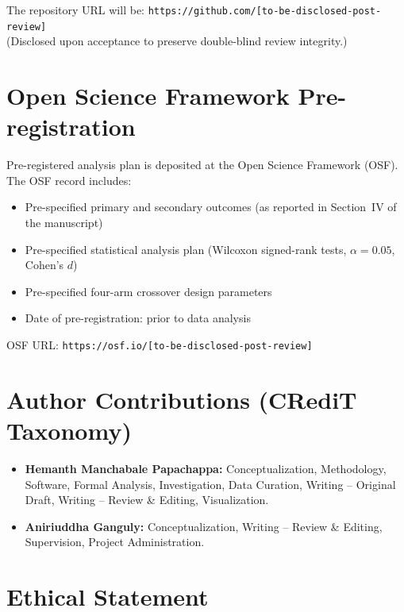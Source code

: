\documentclass[11pt]{article}
\begin{document}
The repository URL will be: \texttt{https://github.com/[to-be-disclosed-post-review]}\\
(Disclosed upon acceptance to preserve double-blind review integrity.)

\section{Open Science Framework Pre-registration}

Pre-registered analysis plan is deposited at the Open Science Framework (OSF).
The OSF record includes:
\begin{itemize}
  \item Pre-specified primary and secondary outcomes (as reported in Section~IV
        of the manuscript)
  \item Pre-specified statistical analysis plan (Wilcoxon signed-rank tests,
        $\alpha{=}0.05$, Cohen's $d$)
  \item Pre-specified four-arm crossover design parameters
  \item Date of pre-registration: prior to data analysis
\end{itemize}

OSF URL: \texttt{https://osf.io/[to-be-disclosed-post-review]}

\section{Author Contributions (CRediT Taxonomy)}

\begin{itemize}
  \item \textbf{Hemanth Manchabale Papachappa:} Conceptualization, Methodology,
        Software, Formal Analysis, Investigation, Data Curation, Writing --
        Original Draft, Writing -- Review \& Editing, Visualization.
  \item \textbf{Aniriuddha Ganguly:} Conceptualization, Writing -- Review \&
        Editing, Supervision, Project Administration.
\end{itemize}

\section{Ethical Statement}
\end{document}
